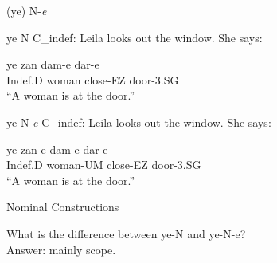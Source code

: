 \documentclass[10pt]{beamer}
\begin{document}
\begin {frame} {(ye) N-\emph{{\color {red}e}}}

\begin {exampleblock} {ye N}
{\small C_{indef}: Leila looks out the window. She says:}
	\begin {exe}
		\ex \label{} \gll	ye zan dam-e dar-e\\
					{\scriptsize Indef.D} woman close-{\scriptsize EZ} door-{\scriptsize 3.SG}\\
			``A woman is at the door.''\\
	\end {exe}
\end {exampleblock}
\pause
\begin {exampleblock} {ye N-\emph{{\color {red}e}}}
{\small C_{indef}: Leila looks out the window. She says:}
	\begin {exe}
		\ex \label{} \gll	ye zan-{\color{red}e} dam-e dar-e\\
					{\scriptsize Indef.D} woman-{\scriptsize UM} close-{\scriptsize EZ} door-{\scriptsize 3.SG}\\
			``A woman is at the door.''\\
	\end {exe}
\end {exampleblock}

\end {frame}


\begin {frame} {Nominal Constructions}

What is the difference between ye-N and ye-N-{\color {red}e}? \\ \pause
Answer: mainly scope.

\end {frame}
\end{document}
